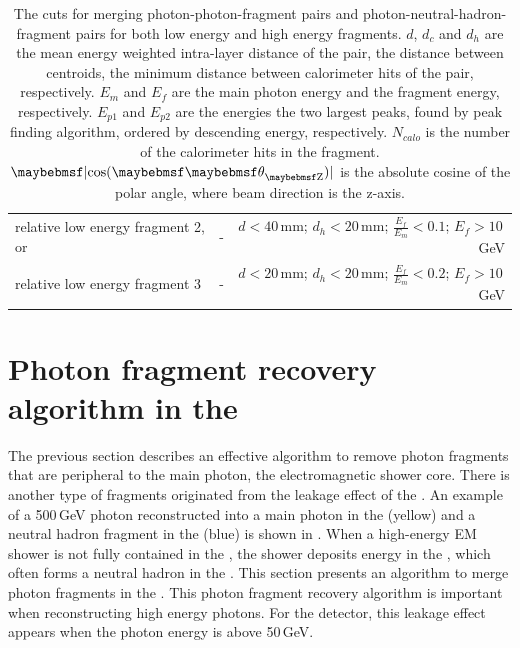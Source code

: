 \begin{table}[htbp]
\begin{tabular}{l  r  r }
\multicolumn{1}{L{0.3\textwidth}}{relative low energy fragment 2, or} & \multicolumn{1}{R{0.3\textwidth}}{-}  & \multicolumn{1}{R{0.3\textwidth}}{$d < 40$\,mm; $d_h < 20$\,mm; $\frac{E_f}{E_m} < 0.1$; $E_f > 10$\,GeV} \\
\multicolumn{1}{L{0.3\textwidth}}{relative low energy fragment 3} & \multicolumn{1}{R{0.3\textwidth}}{-}  & \multicolumn{1}{R{0.3\textwidth}}{$d < 20$\,mm; $d_h < 20$\,mm; $\frac{E_f}{E_m} < 0.2$; $E_f > 10$\,GeV} \\
\hline
\hline
\end{tabular}

\caption[The cuts for photon fragment removal algorithm in the \ECAL.]%
{The cuts for merging photon-photon-fragment pairs and photon-neutral-hadron-fragment pairs for both low energy and high energy fragments. $d$, $d_c$ and $d_h$ are the mean energy weighted intra-layer distance of the pair, the distance between centroids, the minimum distance between calorimeter hits of the pair, respectively. $E_m$ and $E_f$ are the main photon energy and the fragment energy, respectively. $E_{p1}$ and $E_{p2}$ are the energies the two largest peaks, found by peak finding algorithm, ordered by descending energy, respectively. $N_{calo}$ is the number of the calorimeter hits in the fragment. $\absCosTheta$ is the absolute cosine of the polar angle, where beam direction is the z-axis.}
\label{tab:photonFragRemovalCuts}
\end{table}


\section{Photon fragment recovery algorithm in the \HCAL}
\label{sec:photonHighEFragRemoval}

The previous section describes an effective algorithm to remove photon fragments that are peripheral to the main photon, the electromagnetic shower core. There is another type of fragments originated from the leakage effect of the \ECAL. An example of a 500\,GeV photon reconstructed into a main photon in the \ECAL (yellow) and a neutral hadron fragment in the \HCAL (blue) is shown in .
When a high-energy EM shower is not fully contained in the \ECAL, the shower deposits energy in the \HCAL, which often forms a neutral hadron in the \HCAL. This section presents an algorithm to merge photon fragments in the \HCAL. This photon fragment recovery algorithm is important when reconstructing  high energy photons. For the \ILD detector, this \ECAL leakage effect appears when the photon energy is above 50\,GeV.




